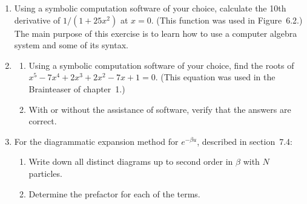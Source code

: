 \documentclass{article}
\begin{document}
\begin{enumerate}
\item 
Using a symbolic computation software of your choice, calculate the 10th derivative of $1/(1+25 x^2)$ at $x=0$. (This function was used in Figure~6.2.)
The main purpose of this exercise is to learn how to use a computer algebra system and some of its syntax.

\item\label{prbl:polysolve}
\begin{enumerate} \setlength{\itemsep}{0pt}
\item Using a symbolic computation software of your choice, find the roots of $x^5 - 7 x^4 + 2 x^3 + 2 x^2 - 7 x + 1 = 0$.
(This equation was used in the Brainteaser of chapter~1.)
\item With or without the assistance of software, verify that the answers are correct.
\end{enumerate}

\item For the diagrammatic expansion method for $e^{-\beta u}$, described in section~7.4: \label{prbl:feynman}
\vspace{-1em}
\begin{enumerate} \setlength{\itemsep}{0pt}
\item Write down all distinct diagrams up to second order in $\beta$ with $N$ particles. 
\item Determine the prefactor for each of the terms.
\end{enumerate}
 
\end{enumerate}










\newpage
\end{document}
